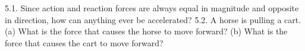 






5.1. Since action and reaction forces are always equal in magnitude and opposite in direction, how can anything ever be
accelerated?
5.2. A horse is pulling a cart. (a) What is the force that causes the horse to move forward? (b) What is the force that causes
the cart to move forward?

